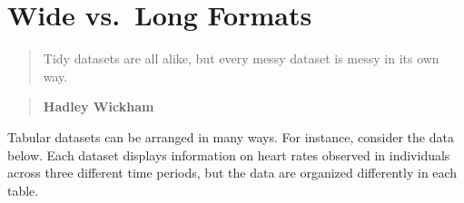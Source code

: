 \documentclass[
]{book}
\begin{document}
\hypertarget{wide-vs.-long-formats}{%
\section{Wide vs.~Long Formats}\label{wide-vs.-long-formats}}

\begin{quote}
Tidy datasets are all alike, but every messy dataset is messy in its own way.
\end{quote}

\begin{quote}
\textbf{Hadley Wickham}
\end{quote}

Tabular datasets can be arranged in many ways. For instance, consider the data below. Each dataset displays information on heart rates observed in individuals across three different time periods, but the data are organized differently in each table.
\end{document}
